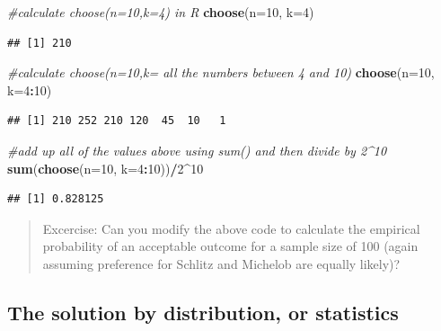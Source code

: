 \documentclass[openany]{book}
\newenvironment{Shaded}{\begin{snugshade}}{\end{snugshade}}
\newcommand{\CommentTok}[1]{\textcolor[rgb]{0.56,0.35,0.01}{\textit{#1}}}
\newcommand{\DataTypeTok}[1]{\textcolor[rgb]{0.13,0.29,0.53}{#1}}
\newcommand{\DecValTok}[1]{\textcolor[rgb]{0.00,0.00,0.81}{#1}}
\newcommand{\KeywordTok}[1]{\textcolor[rgb]{0.13,0.29,0.53}{\textbf{#1}}}
\newcommand{\NormalTok}[1]{#1}
\newcommand{\OperatorTok}[1]{\textcolor[rgb]{0.81,0.36,0.00}{\textbf{#1}}}
\begin{document}
\begin{Shaded}
\begin{Highlighting}[]
\CommentTok{#calculate choose(n=10,k=4) in R}
\KeywordTok{choose}\NormalTok{(}\DataTypeTok{n=}\DecValTok{10}\NormalTok{, }\DataTypeTok{k=}\DecValTok{4}\NormalTok{)}
\end{Highlighting}
\end{Shaded}

\begin{verbatim}
## [1] 210
\end{verbatim}

\begin{Shaded}
\begin{Highlighting}[]
\CommentTok{#calculate choose(n=10,k= all the numbers between 4 and 10)}
\KeywordTok{choose}\NormalTok{(}\DataTypeTok{n=}\DecValTok{10}\NormalTok{, }\DataTypeTok{k=}\DecValTok{4}\OperatorTok{:}\DecValTok{10}\NormalTok{)}
\end{Highlighting}
\end{Shaded}

\begin{verbatim}
## [1] 210 252 210 120  45  10   1
\end{verbatim}

\begin{Shaded}
\begin{Highlighting}[]
\CommentTok{#add up all of the values above using sum() and then divide by 2^10}
\KeywordTok{sum}\NormalTok{(}\KeywordTok{choose}\NormalTok{(}\DataTypeTok{n=}\DecValTok{10}\NormalTok{, }\DataTypeTok{k=}\DecValTok{4}\OperatorTok{:}\DecValTok{10}\NormalTok{))}\OperatorTok{/}\DecValTok{2}\OperatorTok{^}\DecValTok{10}
\end{Highlighting}
\end{Shaded}

\begin{verbatim}
## [1] 0.828125
\end{verbatim}

\begin{quote}
Excercise: Can you modify the above code to calculate the empirical probability of an acceptable outcome for a sample size of 100 (again assuming preference for Schlitz and Michelob are equally likely)?
\end{quote}

\hypertarget{the-solution-by-distribution-or-statistics}{%
\subsection*{The solution by distribution, or statistics}\label{the-solution-by-distribution-or-statistics}}
\end{document}
